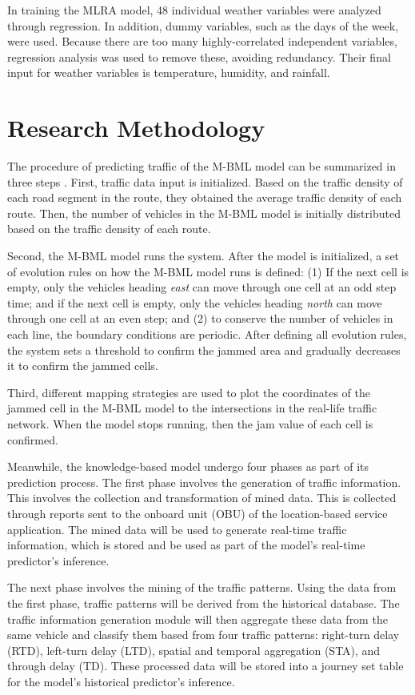 In training the MLRA model, 48 individual weather variables were analyzed through regression. In addition, dummy variables, such as the days of the week, were used. Because there are too many highly-correlated independent variables, regression analysis was used to remove these, avoiding redundancy. Their final input for weather variables is temperature, humidity, and rainfall. 




\section{Research Methodology}
The procedure of predicting traffic of the M-BML model can be summarized in three steps . First, traffic data input is initialized. Based on the traffic density of each road segment in the route, they obtained the average traffic density of each route. Then, the number of vehicles in the M-BML model is initially distributed based on the traffic density of each route.

Second, the M-BML model runs the system. After the model is initialized, a set of evolution rules on how the M-BML model runs is defined: (1) If the next cell is empty, only the vehicles heading \textit{east} can move through one cell at an odd step time; and if the next cell is empty, only the vehicles heading \textit{north} can move through one cell at an even step; and (2) to conserve the number of vehicles in each line, the boundary conditions are periodic. After defining all evolution rules, the system sets a threshold to confirm the jammed area and gradually decreases it to confirm the jammed cells.

Third, different mapping strategies are used to plot the coordinates of the jammed cell in the M-BML model to the intersections in the real-life traffic network. When the model stops running, then the jam value of each cell is confirmed. 

Meanwhile, the knowledge-based model undergo four phases as part of its prediction process. The first phase involves the generation of traffic information. This involves the collection and transformation of mined data. This is collected through reports sent to the onboard unit (OBU) of the location-based service application. The mined data will be used to generate real-time traffic information, which is stored and be used as part of the model's real-time predictor's inference.

The next phase involves the mining of the traffic patterns. Using the data from the first phase, traffic patterns will be derived from the historical database. The traffic information generation module will then aggregate these data from the same vehicle and classify them based from four traffic patterns: right-turn delay (RTD), left-turn delay (LTD), spatial and temporal aggregation (STA), and through delay (TD). These processed data will be stored into a journey set table for the model's historical predictor's inference.

